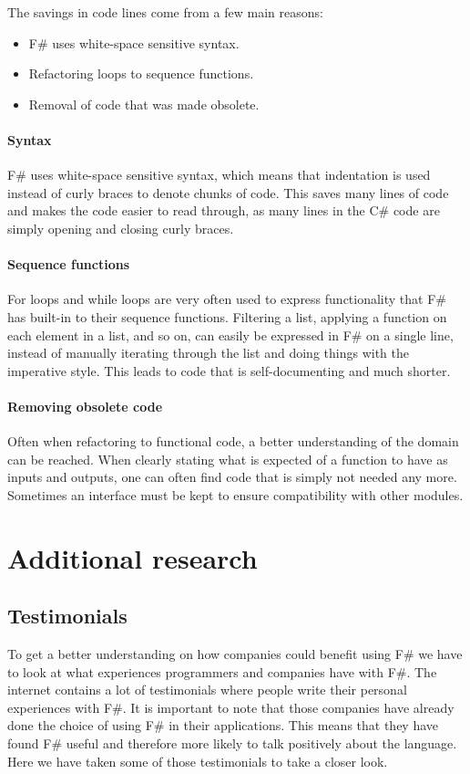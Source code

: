 \documentclass[12pt, a4paper]{article}
\begin{document}
The savings in code lines come from a few main reasons:
\begin{itemize}
	\item F\# uses white-space sensitive syntax.
	\item Refactoring loops to sequence functions.
	\item Removal of code that was made obsolete.
\end{itemize}

\paragraph{Syntax} F\# uses white-space sensitive syntax, which means that indentation is used instead of curly braces to denote chunks of code. This saves many lines of code and makes the code easier to read through, as many lines in the C\# code are simply opening and closing curly braces.

\paragraph{Sequence functions} For loops and while loops are very often used to express functionality that F\# has built-in to their sequence functions. Filtering a list, applying a function on each element in a list, and so on, can easily be expressed in F\# on a single line, instead of manually iterating through the list and doing things with the imperative style. This leads to code that is self-documenting and much shorter.

\paragraph{Removing obsolete code} Often when refactoring to functional code, a better understanding of the domain can be reached. When clearly stating what is expected of a function to have as inputs and outputs, one can often find code that is simply not needed any more. Sometimes an interface must be kept to ensure compatibility with other modules.

\newpage

\section{Additional research}

\subsection{Testimonials}
\label{Testimonials}
To get a better understanding on how companies could benefit using F\# we have to look at what experiences programmers and companies have with F\#. The internet contains a lot of testimonials where people write their personal experiences with F\#. It is important to note that those companies have already done the choice of using F\# in their applications. This means that they have found F\# useful and therefore more likely to talk positively about the language. Here we have taken some of those testimonials to take a closer look.
\end{document}
